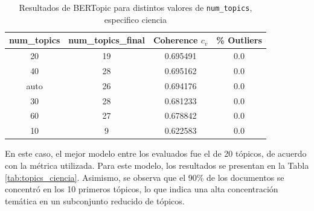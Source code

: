 \documentclass[11pt,a4paper]{article}
\begin{document}
		\begin{table}[H]
			\centering
			\begin{tabular}{c c c c}
				\hline
				\textbf{num\_topics} & \textbf{num\_topics\_final} & \textbf{Coherence $c_v$} & \textbf{\% Outliers} \\
				\hline
				20   & 19 & 0.695491 & 0.0 \\
				40   & 28 & 0.695162 & 0.0 \\
				auto & 26 & 0.694176 & 0.0 \\
				30   & 28 & 0.681233 & 0.0 \\
				60   & 27 & 0.678842 & 0.0 \\
				10   & 9  & 0.622583 & 0.0 \\
				\hline
			\end{tabular}
			\caption{Resultados de BERTopic para distintos valores de \texttt{num\_topics}, especifico ciencia}
			\label{tab:bertopic_nr_topics_ciencia}
		\end{table}
		
		En este caso, el mejor modelo entre los evaluados fue el de 20 tópicos, de acuerdo con la métrica utilizada. Para este modelo, los resultados se presentan en la Tabla \ref{tab:topics_ciencia}. Asimismo, se observa que el 90\% de los documentos se concentró en los 10 primeros tópicos, lo que indica una alta concentración temática en un subconjunto reducido de tópicos.
		
\end{document}
